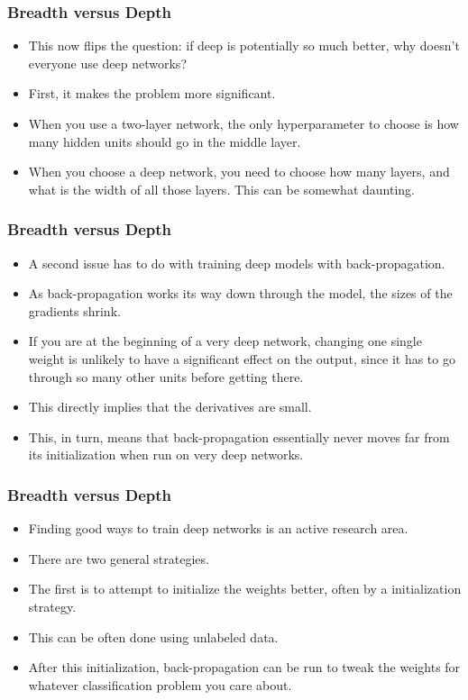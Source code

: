 \documentclass[trans]{beamer}
\begin{document}
\begin{frame}
  \frametitle{Breadth versus Depth}
\begin{itemize}
\item
This now flips the question: if deep is potentially so much better,
why doesn't everyone use deep networks? 
\item   First, it makes the  problem
more significant.
\item When you use a two-layer network, the only
hyperparameter to choose is how many hidden units should go in the
middle layer.
\item  When you choose a deep network, you need to choose how
many layers, and what is the width of all those layers.  This can be
somewhat daunting.
\end{itemize}
\end{frame}

\begin{frame}
  \frametitle{Breadth versus Depth}
\begin{itemize}
\item
A second issue has to do with training deep models with
back-propagation. 
\item  As back-propagation works its way down
through the model, the sizes of the gradients shrink.
\item   If you are at the
beginning of a very deep network, changing one single weight is
unlikely to have a significant effect on the output, since it has to
go through so many other units before getting there. 
\item  This directly
implies that the derivatives are small.  
\item This, in turn, means that
back-propagation essentially never moves far from its initialization
when run on very deep networks.
\end{itemize}
\end{frame}

\begin{frame}
  \frametitle{Breadth versus Depth}
\begin{itemize}
\item
Finding good ways to train deep networks is an active research area.
\item There are two general strategies. 
\item The first is to attempt to
initialize the weights better, often by a 
initialization strategy. 
\item This can be often done using unlabeled data.
\item After this initialization, back-propagation can be run to tweak the
weights for whatever classification problem you care about.  
\end{itemize}
\end{frame}
\end{document}
